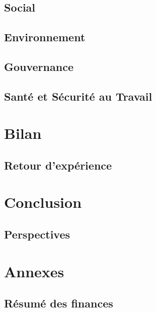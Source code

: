 \documentclass[12pt, oneside, a4paper, titlepage]{report}
\begin{document}
\section{Social}%
\label{sec:rse::social}

\section{Environnement}%
\label{sec:rse::env}

\section{Gouvernance}%
\label{sec:rse::gouv}

\section{Santé et Sécurité au Travail}%
\label{sec:rse::sst}


\chapter{Bilan}%
\label{cha:bilan}

\section{Retour d'expérience}%
\label{sec:bilan::ret-exp}


\chapter{Conclusion}%
\label{cha:conclu}

\section{Perspectives}%
\label{sec:conclu::persp}


\chapter{Annexes}%
\label{cha:annexes}

\section{Résumé des finances}%
\label{sec:annexes::finances-ocd}
\end{document}
